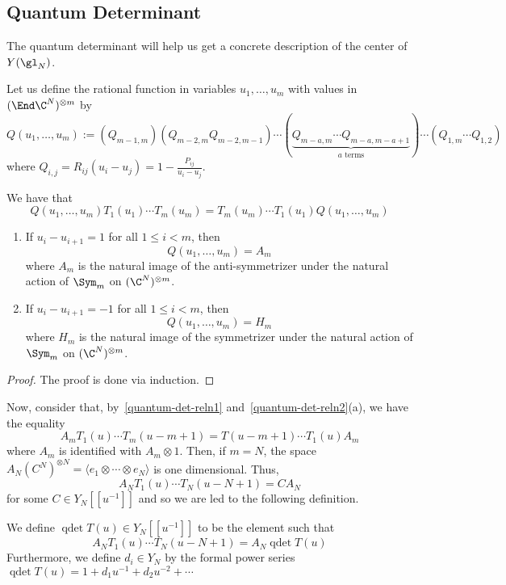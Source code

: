 \documentclass[11pt,leqno,oneside]{amsbook}
\numberwithin{thm}{section}
\newcommand{\qdet}{\operatorname{qdet}}
\begin{document}
\subsection{Quantum Determinant}
The quantum determinant will help us get a concrete description of the
center of \(Y(\gl_N)\).
\begin{defn}
  Let us define the rational function in variables \(u_1, \ldots,
  u_m\) with values in \((\End \C^N)^{\otimes m}\) by \[
Q(u_1,\ldots,u_m) := (Q_{m-1,m})(Q_{m-2,m}Q_{m-2,m-1}) \cdots
  (\underbrace{Q_{m-a,m} \cdots Q_{m-a,m-a+1}}_{a \text{ terms}})
  \cdots (Q_{1,m}\cdots Q_{1,2})
  \]
  where \(Q_{i,j} = R_{ij}(u_i-u_j) = 1-\frac{P_{ij}}{u_i-u_j}\). 
\end{defn}
\begin{prop}\label{quantum-det-reln1}
  We have that \[
    Q(u_1, \ldots, u_m) T_1(u_1) \cdots T_m(u_m) = T_m(u_m) \cdots
    T_1(u_1) Q(u_1, \ldots, u_m)
  \]
\end{prop}
\begin{prop}\label{quantum-det-reln2}
  \begin{enumerate}
  \item If \(u_i-u_{i+1} = 1\) for all \(1 \leq i < m\), then
    \[
      Q(u_1, \ldots, u_m) = A_m
    \]
    where \(A_m\) is the natural image of the anti-symmetrizer under
    the natural action of \(\Sym_m\) on \((\C^N)^{\otimes m}\).
  \item If \(u_i-u_{i+1} = -1\) for all \(1 \leq i < m\), then \[
      Q(u_1, \ldots, u_m) = H_m
    \]
    where \(H_m\) is the natural image of the symmetrizer under the
    natural action of \(\Sym_m\) on \((\C^N)^{\otimes m}\).
  \end{enumerate}
\end{prop}
\begin{proof}
  The proof is done via induction.
\end{proof}
Now, consider that, by~\ref{quantum-det-reln1}
and~\ref{quantum-det-reln2}(a), we have the equality \[ 
  A_m T_1(u) \cdots T_m(u-m+1) = T(u-m+1) \cdots T_1(u) A_m
\]
where \(A_m\) is identified with \(A_m \otimes 1\). Then, if \(m=N\),
the space \(A_N (C^N)^{\otimes N} = \langle e_1 \otimes \cdots \otimes
e_N\rangle\) is one dimensional. Thus, \[
  A_N T_1(u) \cdots T_N(u-N+1) = C A_N
\]
for some \(C \in Y_N[[u^{-1}]]\) and so we are led to the following
definition. 
\begin{defn}
  We define \(\qdet T(u) \in Y_N[[u^{-1}]]\) to be the element
  such that \[
    A_N T_1(u) \cdots T_N(u-N+1) = A_N \qdet T(u)
  \]
  Furthermore, we define \(d_i \in Y_N\) by the formal power series
  \(\qdet T(u) = 1+d_1 u^{-1} + d_2 u^{-2} + \cdots\)
\end{defn}
\end{document}
